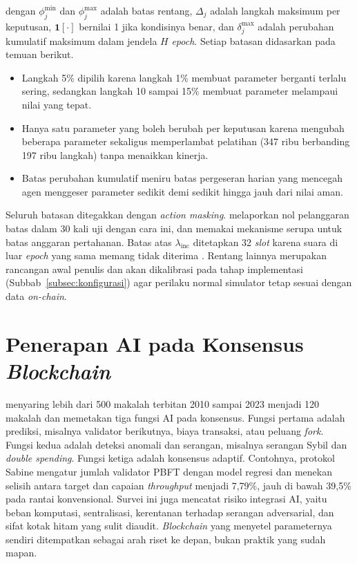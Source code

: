 \noindent dengan $\phi_j^{\min}$ dan $\phi_j^{\max}$ adalah batas rentang, $\Delta_j$ adalah langkah maksimum per keputusan, $\mathbf{1}[\cdot]$ bernilai 1 jika kondisinya benar, dan $\delta_j^{\max}$ adalah perubahan kumulatif maksimum dalam jendela $H$ \textit{epoch}. Setiap batasan didasarkan pada temuan \textcite{skowronski2026adaptive} berikut.
\begin{itemize}
	\item Langkah 5\% dipilih karena langkah 1\% membuat parameter berganti terlalu sering, sedangkan langkah 10 sampai 15\% membuat parameter melampaui nilai yang tepat.
	\item Hanya satu parameter yang boleh berubah per keputusan karena mengubah beberapa parameter sekaligus memperlambat pelatihan (347 ribu berbanding 197 ribu langkah) tanpa menaikkan kinerja.
	\item Batas perubahan kumulatif meniru batas pergeseran harian yang mencegah agen menggeser parameter sedikit demi sedikit hingga jauh dari nilai aman.
\end{itemize}
Seluruh batasan ditegakkan dengan \textit{action masking}. \textcite{skowronski2026adaptive} melaporkan nol pelanggaran batas dalam 30 kali uji dengan cara ini, dan \textcite{wushishi2026coadam} memakai mekanisme serupa untuk batas anggaran pertahanan. Batas atas $\lambda_{\text{inc}}$ ditetapkan 32 \textit{slot} karena suara di luar \textit{epoch} yang sama memang tidak diterima \parencite{laneve2025stochastic}. Rentang lainnya merupakan rancangan awal penulis dan akan dikalibrasi pada tahap implementasi (Subbab~\ref{subsec:konfigurasi}) agar perilaku normal simulator tetap sesuai dengan data \textit{on-chain}.

\section{Penerapan AI pada Konsensus \textit{Blockchain}}
\label{sec:ai_konsensus}
\textcite{rizal2025enhancing} menyaring lebih dari 500 makalah terbitan 2010 sampai 2023 menjadi 120 makalah dan memetakan tiga fungsi AI pada konsensus. Fungsi pertama adalah prediksi, misalnya validator berikutnya, biaya transaksi, atau peluang \textit{fork}. Fungsi kedua adalah deteksi anomali dan serangan, misalnya serangan Sybil dan \textit{double spending}. Fungsi ketiga adalah konsensus adaptif. Contohnya, protokol Sabine mengatur jumlah validator PBFT dengan model regresi dan menekan selisih antara target dan capaian \textit{throughput} menjadi 7,79\%, jauh di bawah 39,5\% pada rantai konvensional. Survei ini juga mencatat risiko integrasi AI, yaitu beban komputasi, sentralisasi, kerentanan terhadap serangan adversarial, dan sifat kotak hitam yang sulit diaudit. \textit{Blockchain} yang menyetel parameternya sendiri ditempatkan sebagai arah riset ke depan, bukan praktik yang sudah mapan.

